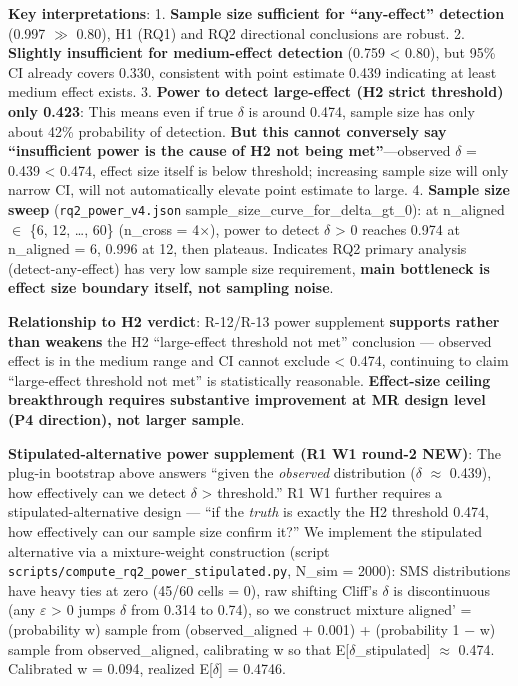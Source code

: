 \documentclass[review,12pt,authoryear]{elsarticle}
\begin{document}
\textbf{Key interpretations}: 1. \textbf{Sample size sufficient for
``any-effect'' detection} (0.997 $\gg$ 0.80), H1 (RQ1) and RQ2 directional
conclusions are robust. 2. \textbf{Slightly insufficient for
medium-effect detection} (0.759 \textless{} 0.80), but 95\% CI already
covers 0.330, consistent with point estimate 0.439 indicating at least
medium effect exists. 3. \textbf{Power to detect large-effect (H2 strict
threshold) only 0.423}: This means even if true $\delta$ is around 0.474,
sample size has only about 42\% probability of detection. \textbf{But
this cannot conversely say ``insufficient power is the cause of H2 not
being met''}---observed $\delta$ = 0.439 \textless{} 0.474, effect size itself
is below threshold; increasing sample size will only narrow CI, will not
automatically elevate point estimate to large. 4. \textbf{Sample size
sweep} (\texttt{rq2\_power\_v4.json}
sample\_size\_curve\_for\_delta\_gt\_0): at n\_aligned $\in$ \{6, 12,
\ldots, 60\} (n\_cross = 4$\times$), power to detect $\delta$ \textgreater{} 0 reaches
0.974 at n\_aligned = 6, 0.996 at 12, then plateaus. Indicates RQ2
primary analysis (detect-any-effect) has very low sample size
requirement, \textbf{main bottleneck is effect size boundary itself, not
sampling noise}.

\textbf{Relationship to H2 verdict}: R-12/R-13 power supplement
\textbf{supports rather than weakens} the H2 ``large-effect threshold
not met'' conclusion --- observed effect is in the medium range and CI
cannot exclude \textless{} 0.474, continuing to claim ``large-effect
threshold not met'' is statistically reasonable. \textbf{Effect-size
ceiling breakthrough requires substantive improvement at MR design level
(P4 direction), not larger sample}.

\textbf{Stipulated-alternative power supplement (R1 W1 round-2 NEW)}:
The plug-in bootstrap above answers ``given the \emph{observed}
distribution ($\delta$ $\approx$ 0.439), how effectively can we detect $\delta$ \textgreater{}
threshold.'' R1 W1 further requires a stipulated-alternative design ---
``if the \emph{truth} is exactly the H2 threshold 0.474, how effectively
can our sample size confirm it?'' We implement the stipulated
alternative via a mixture-weight construction (script
\texttt{scripts/compute\_rq2\_power\_stipulated.py}, N\_sim = 2000): SMS
distributions have heavy ties at zero (45/60 cells = 0), raw shifting
Cliff's $\delta$ is discontinuous (any $\varepsilon$ \textgreater{} 0 jumps $\delta$ from 0.314 to
0.74), so we construct mixture aligned' = (probability w) sample from
(observed\_aligned + 0.001) + (probability 1 − w) sample from
observed\_aligned, calibrating w so that E{[}$\delta$\_stipulated{]} $\approx$ 0.474.
Calibrated w = 0.094, realized E{[}$\delta${]} = 0.4746.
\end{document}
